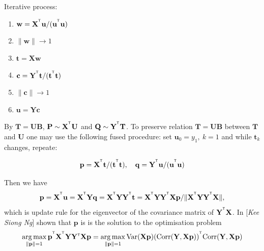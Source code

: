 \documentclass[12pt,twoside]{article}
\newcommand{\bx}{\mathbf{x}}
\newcommand{\by}{\mathbf{y}}
\newcommand{\bw}{\mathbf{w}}
\newcommand{\bY}{\mathbf{Y}}
\newcommand{\bX}{\mathbf{X}}
\newcommand{\bu}{\mathbf{u}}
\newcommand{\bt}{\mathbf{t}}
\newcommand{\bp}{\mathbf{p}}
\newcommand{\bq}{\mathbf{q}}
\newcommand{\bc}{\mathbf{c}}
\newcommand{\bP}{\mathbf{P}}
\newcommand{\bB}{\mathbf{B}}
\begin{document}
	Iterative process:
	\begin{multicols}{2}








	\begin{enumerate}
		\item $\bw = \bX^{\T} \bu / (\bu^{\T} \bu)$
		\item $\| \bw \| \to 1$
		\item $\bt = \bX \bw$
		\item $\bc = \bY^{\T} \bt / (\bt^{\T} \bt)$
		\item $\| \bc \| \to 1$
		\item $\bu = \bY \bc$
	\end{enumerate}
	\end{multicols}

	By $\mathbf{T} = \mathbf{U} \bB$, $\bP \sim \bX^{\T} \mathbf{U}$ and $\mathbf{Q} \sim \bY^{\T} \mathbf{T}$. To preserve relation $\mathbf{T} = \mathbf{U} \bB$ between $\mathbf{T}$ and $\mathbf{U}$  one may use the following fused procedure: set $\bu_0 = y_1,\ k = 1$ and while $\bt_k$ changes, repeate:




	\begin{equation*}
		\bp = \bX^{\T} \bt / (\bt^{\T} \bt), \quad \bq = \bY^{\T} \bu / (\bu^{\T} \bu)
	\end{equation*}

	Then we have 
	\begin{equation*}
		\bp = \bX^{\T}\bu = \bX^{\T} \bY \bq = \bX^{\T} \bY \bY^{\T} \bt = \bX^{\T} \bY \bY^{\T} \bX \bp / \|\bX^{\T} \bY \bY^{\T} \bX\|,
	\end{equation*}
	which is update rule for the eigenvector of the covariance matrix of $\bY^{\T} \bX$. In [\textit{Kee Siong Ng}] shown that $\bp$ is is the solution to the optimisation problem 
	\begin{equation}
	\label{opt_pls}
		\argmax\limits_{\| \bp \| = 1} \bp^{\T}\bX^{\T}\bY\bY{\T}\bX \bp =
		\argmax\limits_{\| \bp \| = 1}  \text{Var} (\bX \bp)(\text{Corr} (\bY, \bX \bp))^{\T} \text{Corr} (\bY, \bX \bp) 
	\end{equation}
	
\end{document}
